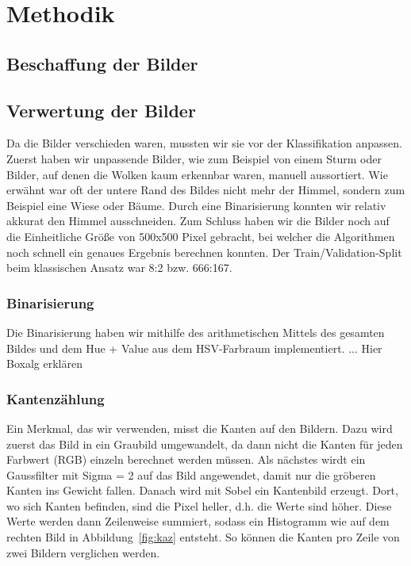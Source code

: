 \documentclass[a4,german]{article}
\begin{document}
\section{Methodik}


\subsection{Beschaffung der Bilder}

\subsection{Verwertung der Bilder}
Da die Bilder verschieden waren, mussten wir sie vor der Klassifikation anpassen.
Zuerst haben wir unpassende Bilder, wie zum Beispiel von einem Sturm oder Bilder, auf denen die Wolken kaum erkennbar waren, manuell aussortiert.
Wie erwähnt war oft der untere Rand des Bildes nicht mehr der Himmel, sondern zum Beispiel eine Wiese oder Bäume.
Durch eine Binarisierung konnten wir relativ akkurat den Himmel ausschneiden.
Zum Schluss haben wir die Bilder noch auf die Einheitliche Größe von 500x500 Pixel gebracht, bei welcher die Algorithmen noch schnell ein genaues Ergebnis berechnen konnten. Der Train/Validation-Split beim klassischen Ansatz war 8:2 bzw. 666:167.

\subsubsection{Binarisierung}
Die Binarisierung haben wir mithilfe des arithmetischen Mittels des gesamten Bildes und dem Hue + Value aus dem HSV-Farbraum implementiert.
...
Hier Boxalg erklären

\subsubsection{Kantenzählung}
Ein Merkmal, das wir verwenden, misst die Kanten auf den Bildern. Dazu wird zuerst das Bild in ein Graubild umgewandelt, da dann nicht die Kanten für jeden Farbwert (RGB) einzeln berechnet werden müssen. Als nächstes wirdt ein Gaussfilter mit Sigma = 2 auf das Bild angewendet, damit nur die gröberen Kanten ins Gewicht fallen. Danach wird mit Sobel ein Kantenbild erzeugt. Dort, wo sich Kanten befinden, sind die Pixel heller, d.h. die Werte sind höher. Diese Werte werden dann Zeilenweise summiert, sodass ein Histogramm wie auf dem rechten Bild in Abbildung~\ref{fig:kaz} entsteht. So können die Kanten pro Zeile von zwei Bildern verglichen werden.
\end{document}
